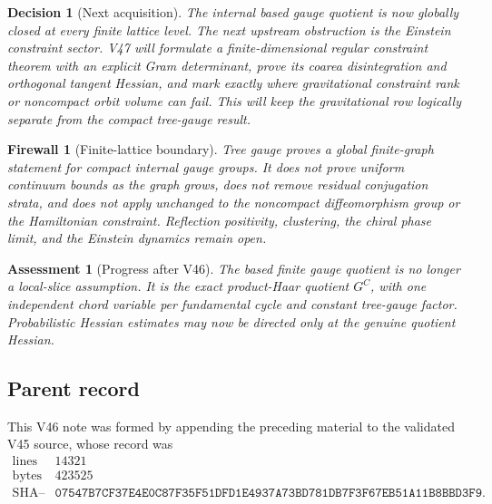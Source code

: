 \documentclass[11pt]{article}
\newtheorem{assessment}[theorem]{Assessment}
\newtheorem{firewall}[theorem]{Firewall}
\newtheorem{decision}[theorem]{Decision}
\begin{document}
\begin{decision}[Next acquisition]
\label{dec:v11v46-next}
The internal based gauge quotient is now globally closed at every
finite lattice level.  The next upstream obstruction is the Einstein
constraint sector.  V47 will formulate a finite-dimensional regular
constraint theorem with an explicit Gram determinant, prove its
coarea disintegration and orthogonal tangent Hessian, and mark exactly
where gravitational constraint rank or noncompact orbit volume can
fail.  This will keep the gravitational row logically separate from
the compact tree-gauge result.
\end{decision}

\begin{firewall}[Finite-lattice boundary]
\label{fire:v11v46-boundary}
Tree gauge proves a global finite-graph statement for compact internal
gauge groups.  It does not prove uniform continuum bounds as the graph
grows, does not remove residual conjugation strata, and does not apply
unchanged to the noncompact diffeomorphism group or the Hamiltonian
constraint.  Reflection positivity, clustering, the chiral phase
limit, and the Einstein dynamics remain open.
\end{firewall}

\begin{assessment}[Progress after V46]
\label{ass:v11v46-status}
The based finite gauge quotient is no longer a local-slice
assumption.  It is the exact product-Haar quotient \(G^C\), with one
independent chord variable per fundamental cycle and constant
tree-gauge factor.  Probabilistic Hessian estimates may now be directed
only at the genuine quotient Hessian.
\end{assessment}

\subsection{Parent record}

This V46 note was formed by appending the preceding material to the
validated V45 source, whose record was
\[
\begin{array}{c|c}
\text{lines}&14321\\
\text{bytes}&423525\\
\text{SHA--256}&
\texttt{07547B7CF37E4E0C87F35F51DFD1E4937A73BD781DB7F3F67EB51A11B8BBD3F9}.
\end{array}                                                     \tag{46.17}
\]

\end{document}
